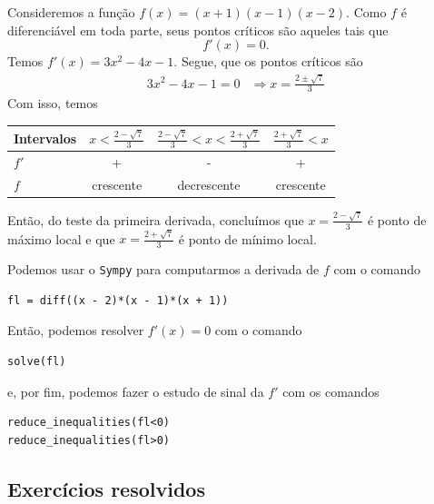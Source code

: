 \begin{ex}
  Consideremos a função $f(x)=(x+1)(x-1)(x-2)$. Como $f$ é diferenciável em toda parte, seus pontos críticos são aqueles tais que
  \begin{equation}
    f'(x)=0.
  \end{equation}
  Temos $f'(x) = 3x^2-4x-1$. Segue, que os pontos críticos são
  \begin{align}
    3x^2-4x-1=0 &\Rightarrow x = \frac{2\pm \sqrt{7}}{3}
  \end{align}
  Com isso, temos
  
  \begin{tabular}{lccc}\hline
    Intervalos & $x<\frac{2-\sqrt{7}}{3}$ & $\frac{2-\sqrt{7}}{3}<x<\frac{2+\sqrt{7}}{3}$ & $\frac{2+\sqrt{7}}{3}<x$ \\\hline
    $f'$ & + & - & + \\
    $f$ & crescente & decrescente & crescente\\\hline
  \end{tabular}

  Então, do teste da primeira derivada, concluímos que $x=\frac{2-\sqrt{7}}{3}$ é ponto de máximo local e que $x=\frac{2+\sqrt{7}}{3}$ é ponto de mínimo local.

  \ifispython
  Podemos usar o \verb+Sympy+ para computarmos a derivada de $f$ com o comando
\begin{verbatim}
fl = diff((x - 2)*(x - 1)*(x + 1))
\end{verbatim}
  Então, podemos resolver $f'(x)=0$ com o comando
\begin{verbatim}
solve(fl)
\end{verbatim}
  e, por fim, podemos fazer o estudo de sinal da $f'$ com os comandos
\begin{verbatim}
reduce_inequalities(fl<0)
reduce_inequalities(fl>0)
\end{verbatim}
  \fi
\end{ex}

\subsection*{Exercícios resolvidos}


